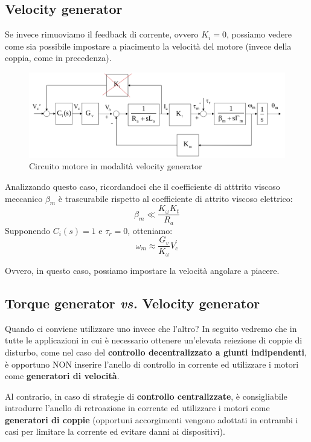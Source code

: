 \subsection{Velocity generator}

Se invece rimuoviamo il feedback di corrente, ovvero $K_i = 0$, possiamo vedere come sia possibile impostare a piacimento la velocità del motore (invece della coppia, come in precedenza).

\begin{figure}[th!]
	\centering
	\includegraphics[width=0.7\linewidth]{images/electric_actuator_4}
	\caption{Circuito motore in modalità velocity generator}
	\label{fig:electricactuator4}
\end{figure}

Analizzando questo caso, ricordandoci che il coefficiente di atttrito viscoso meccanico $\beta_m$ è trascurabile rispetto al coefficiente di attrito viscoso elettrico:
$$
\beta_m \ll \frac{K_\omega K_t}{R_a}
$$
Supponendo $C_i(s) = 1$ e $\tau_r = 0$, otteniamo:
$$
\omega_m \approx \frac{G_v}{K_\omega}V^{'}_c
$$

Ovvero, in questo caso, possiamo impostare la velocità angolare a piacere.



\subsection{Torque generator \textit{vs.} Velocity generator}


Quando ci conviene utilizzare uno invece che l'altro?
In seguito vedremo che in tutte le applicazioni in cui è necessario ottenere un’elevata reiezione di coppie di disturbo, come nel caso del \textbf{controllo decentralizzato a giunti indipendenti}, è opportuno NON inserire l’anello di controllo in corrente ed utilizzare i motori come \textbf{generatori di velocità}.

Al contrario, in caso di strategie di \textbf{controllo centralizzate}, è consigliabile introdurre l’anello di retroazione in corrente ed utilizzare i motori come \textbf{generatori di coppie} (opportuni accorgimenti vengono adottati in entrambi i casi per limitare la corrente ed evitare danni ai dispositivi).

